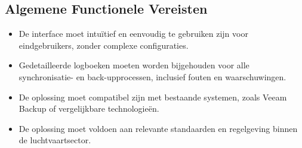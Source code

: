     \subsection{Algemene Functionele Vereisten}
    \begin{itemize}
        \item De interface moet intuïtief en eenvoudig te gebruiken zijn voor eindgebruikers, zonder complexe configuraties.
        \item Gedetailleerde logboeken moeten worden bijgehouden voor alle synchronisatie- en back-upprocessen, inclusief fouten en waarschuwingen.
        \item De oplossing moet compatibel zijn met bestaande systemen, zoals Veeam Backup of vergelijkbare technologieën.
        \item De oplossing moet voldoen aan relevante standaarden en regelgeving binnen de luchtvaartsector.
    \end{itemize}

    

